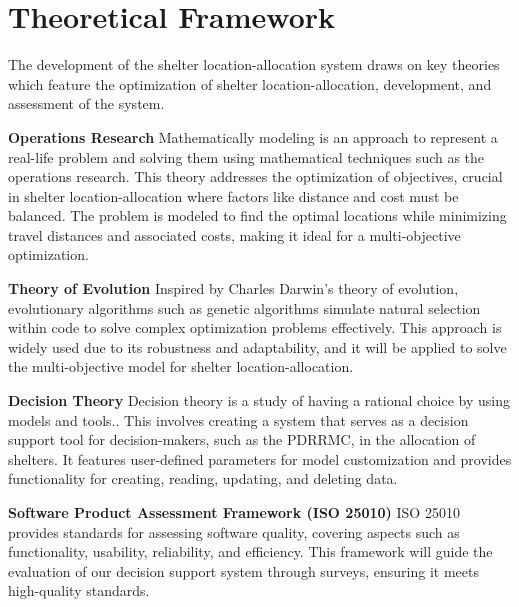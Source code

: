 \section{Theoretical Framework}

The development of the shelter location-allocation system draws on key theories which feature the optimization of shelter location-allocation, development, and assessment of the system.

	\textbf{Operations Research} Mathematically modeling is an approach to represent a real-life problem and solving them using mathematical techniques such as the operations research. This theory addresses the optimization of objectives, crucial in shelter location-allocation where factors like distance and cost must be balanced. The problem is modeled to find the optimal locations while minimizing travel distances and associated costs, making it ideal for a multi-objective optimization.
	
	\textbf{Theory of Evolution} Inspired by Charles Darwin’s theory of evolution, evolutionary algorithms such as genetic algorithms simulate natural selection within code to solve complex optimization problems effectively. This approach is widely used due to its robustness and adaptability, and it will be applied to solve the multi-objective model for shelter location-allocation.
	
	\textbf{Decision Theory} Decision theory is a study of having a rational choice by using models and tools.. This involves creating a system that serves as a decision support tool for decision-makers, such as the PDRRMC, in the allocation of shelters. It features user-defined parameters for model customization and provides functionality for creating, reading, updating, and deleting data.
	
	\textbf{Software Product Assessment Framework (ISO 25010)} ISO 25010 provides standards for assessing software quality, covering aspects such as functionality, usability, reliability, and efficiency. This framework will guide the evaluation of our decision support system through surveys, ensuring it meets high-quality standards.
	 
